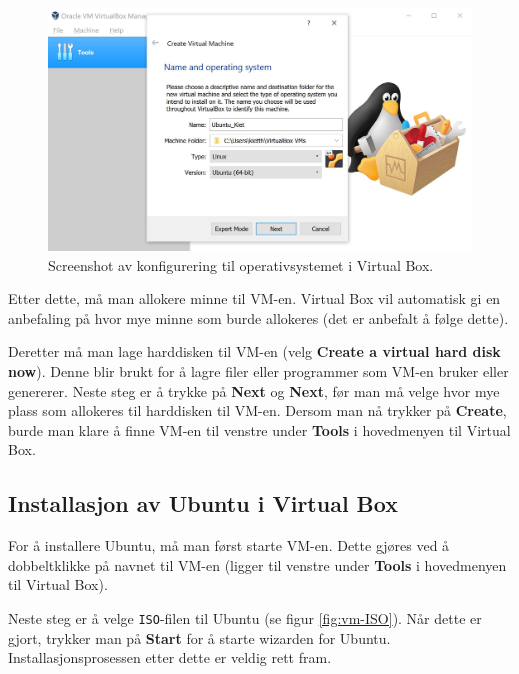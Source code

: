 \begin{figure}[ht]
    \centering
    \includegraphics[scale = .63]{figures/VM_next.JPG}
    \caption{Screenshot av konfigurering til operativsystemet i Virtual Box.}
    \label{fig:vm-nexts}
\end{figure}

Etter dette, må man allokere minne til VM-en. Virtual Box vil automatisk gi en anbefaling på hvor mye minne som burde allokeres (det er anbefalt å følge dette).

Deretter må man lage harddisken til VM-en (velg \textbf{Create a virtual hard disk now}). Denne blir brukt for å lagre filer eller programmer som VM-en bruker eller genererer. Neste steg er å trykke på \textbf{Next} og \textbf{Next}, før man må velge hvor mye plass som allokeres til harddisken til VM-en. Dersom man nå trykker på \textbf{Create}, burde man klare å finne VM-en til venstre under \textbf{Tools} i hovedmenyen til Virtual Box.

\subsection{Installasjon av Ubuntu i Virtual Box}

For å installere Ubuntu, må man først starte VM-en. Dette gjøres ved å dobbeltklikke på navnet til VM-en (ligger til venstre under \textbf{Tools} i hovedmenyen til Virtual Box). 

Neste steg er å velge \verb|ISO|-filen til Ubuntu (se figur \ref{fig:vm-ISO}). Når dette er gjort, trykker man på \textbf{Start} for å starte wizarden for Ubuntu. Installasjonsprosessen etter dette er veldig rett fram.


